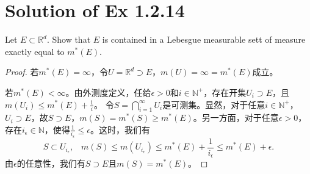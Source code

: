 \documentclass[reqno,a4paper,14pt]{amsart}
\begin{document}
\section{Solution of Ex 1.2.14}
Let $E\subset \mathbb{R}^d$. Show that $E$ is contained in a Lebesgue measurable sett of measure exactly equal to $m^*(E)$.
\begin{proof}
    若$m^*(E)=\infty$，令$U=\mathbb{R}^d\supset E$，$m(U)=\infty=m^*(E)$成立。
    
    若$m^*(E)<\infty$。由外测度定义，任给$\epsilon>0$和$i\in\mathbb{N}^+$，存在开集$U_i\supset E$，且$m(U_i)\leq m^*(E)+\frac{1}{i}$。
    令$S=\bigcap_{i=1}^\infty U_i$是可测集。显然，对于任意$i\in\mathbb{N}^+$，$U_i\supset E$，故$S\supset E$，$m(S)=m^*(S)\geq m^*(E)$。另一方面，对于任意$\epsilon>0$，存在$i_\epsilon\in \mathbb{N}$，使得$\frac{1}{i_\epsilon}\leq \epsilon$。这时，我们有
    \begin{equation*}
        S\subset U_{i_\epsilon},\;\;\; m(S)\leq m(U_{i_\epsilon})\leq m^*(E)+\frac{1}{i_\epsilon}\leq m^*(E)+\epsilon.
    \end{equation*}
    由$\epsilon$的任意性，我们有$S\supset E$且$m(S)=m^*(E)$。
\end{proof}
\end{document}

